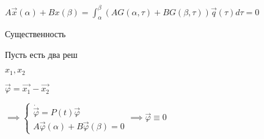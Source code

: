 \documentclass[12pt, a4paper]{article}
\begin{document}
    $A\vec{x}(\alpha) + Bx(\beta) = \int^\beta_\alpha (AG(\alpha, \tau) + BG(\beta, \tau))\vec{q}(\tau)d\tau = 0$

    Существенность

    Пусть есть два реш

    $x_1, x_2$

    $\vec{\varphi} = \vec{x_1} - \vec{x_2}$

    $\implies 
    \begin{cases}
        \dot{\vec\varphi} = P(t)\vec{\varphi}\\
        A\vec{\varphi}(\alpha) + B\vec{\varphi}(\beta) = 0
        
    \end{cases}\implies\vec{\varphi} \equiv 0$

    
    
\end{document}
